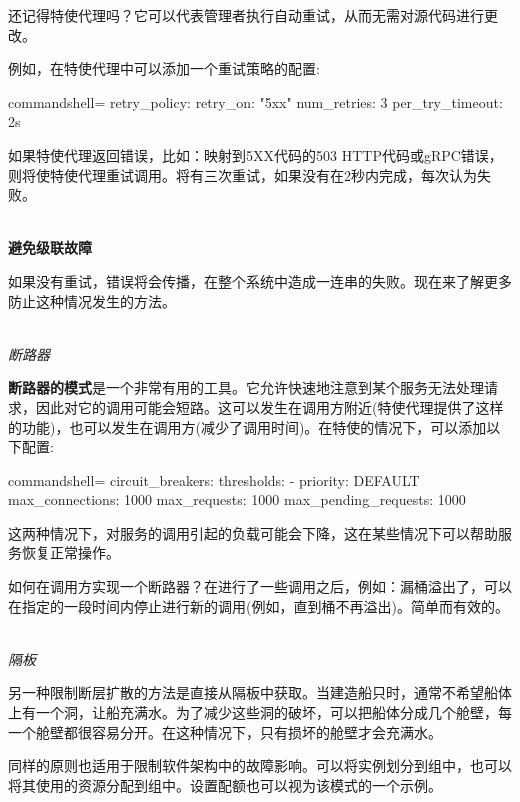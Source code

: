 还记得特使代理吗？它可以代表管理者执行自动重试，从而无需对源代码进行更改。

例如，在特使代理中可以添加一个重试策略的配置:

\begin{tcblisting}{commandshell={}}
retry_policy:
  retry_on: "5xx"
  num_retries: 3
  per_try_timeout: 2s
\end{tcblisting}

如果特使代理返回错误，比如：映射到5XX代码的503 HTTP代码或gRPC错误，则将使特使代理重试调用。将有三次重试，如果没有在2秒内完成，每次认为失败。

\hspace*{\fill} \\ %
\noindent
\textbf{避免级联故障}

如果没有重试，错误将会传播，在整个系统中造成一连串的失败。现在来了解更多防止这种情况发生的方法。

\hspace*{\fill} \\ %
\noindent
\textit{断路器}

\textbf{断路器的模式}是一个非常有用的工具。它允许快速地注意到某个服务无法处理请求，因此对它的调用可能会短路。这可以发生在调用方附近(特使代理提供了这样的功能)，也可以发生在调用方(减少了调用时间)。在特使的情况下，可以添加以下配置:

\begin{tcblisting}{commandshell={}}
circuit_breakers:
  thresholds:
    - priority: DEFAULT
      max_connections: 1000
      max_requests: 1000
      max_pending_requests: 1000
\end{tcblisting}

这两种情况下，对服务的调用引起的负载可能会下降，这在某些情况下可以帮助服务恢复正常操作。

如何在调用方实现一个断路器？在进行了一些调用之后，例如：漏桶溢出了，可以在指定的一段时间内停止进行新的调用(例如，直到桶不再溢出)。简单而有效的。

\hspace*{\fill} \\ %
\noindent
\textit{隔板}

另一种限制断层扩散的方法是直接从隔板中获取。当建造船只时，通常不希望船体上有一个洞，让船充满水。为了减少这些洞的破坏，可以把船体分成几个舱壁，每一个舱壁都很容易分开。在这种情况下，只有损坏的舱壁才会充满水。

同样的原则也适用于限制软件架构中的故障影响。可以将实例划分到组中，也可以将其使用的资源分配到组中。设置配额也可以视为该模式的一个示例。

